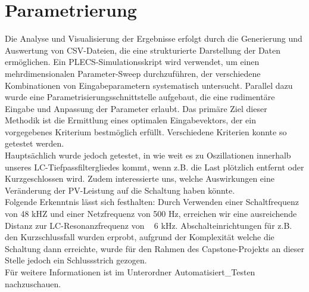 \documentclass[a4paper,11pt,oneside]{article}
\begin{document}
\section{Parametrierung}
Die Analyse und Visualisierung der Ergebnisse erfolgt durch die Generierung und Auswertung von CSV-Dateien, die eine strukturierte Darstellung der Daten ermöglichen. Ein PLECS-Simulationsskript wird verwendet, um einen mehrdimensionalen Parameter-Sweep durchzuführen, der verschiedene Kombinationen von Eingabeparametern systematisch untersucht. Parallel dazu wurde eine Parametrisierungsschnittstelle aufgebaut, die eine rudimentäre Eingabe und Anpassung der Parameter erlaubt. Das primäre Ziel dieser Methodik ist die Ermittlung eines optimalen Eingabevektors, der ein vorgegebenes Kriterium bestmöglich erfüllt. Verschiedene Kriterien konnte so getestet werden.\\
Hauptsächlich wurde jedoch getestet, in wie weit es zu Oszillationen innerhalb unseres LC-Tiefpassfiltergliedes kommt, wenn z.B. die Last plötzlich entfernt oder Kurzgeschlossen wird. Zudem interessierte uns, welche Auswirkungen eine Veränderung der PV-Leistung auf die Schaltung haben könnte.\\ Folgende Erkenntnis lässt sich festhalten: Durch Verwenden einer Schaltfrequenz von 48 kHZ und einer Netzfrequenz von 500 Hz, erreichen wir eine ausreichende Distanz zur LC-Resonanzfrequenz von ~ 6 kHz.
Abschalteinrichtungen für z.B. den Kurzschlussfall wurden erprobt, aufgrund der Komplexität welche die Schaltung dann erreichte, wurde für den Rahmen des Capstone-Projekts an dieser Stelle jedoch ein Schlussstrich gezogen.
\\Für weitere Informationen ist im Unterordner Automatisiert\_Testen nachzuschauen.
\end{document}
